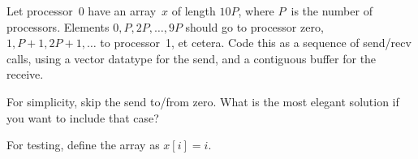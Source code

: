   \label{ex:stridesend}
  Let processor~0 have an array~$x$ of length $10P$, where $P$~is the number of processors.
  Elements $0,P,2P,\ldots,9P$ should go to processor zero, $1,P+1,2P+1,\ldots$ to processor~1,
  et cetera. Code this as a sequence of send/recv calls, using a vector datatype
  for the send, and a contiguous buffer for the receive.

  For simplicity, skip the send to/from zero. What is the most elegant
  solution if you want to include that case?

  For testing, define the array as $x[i]=i$.
